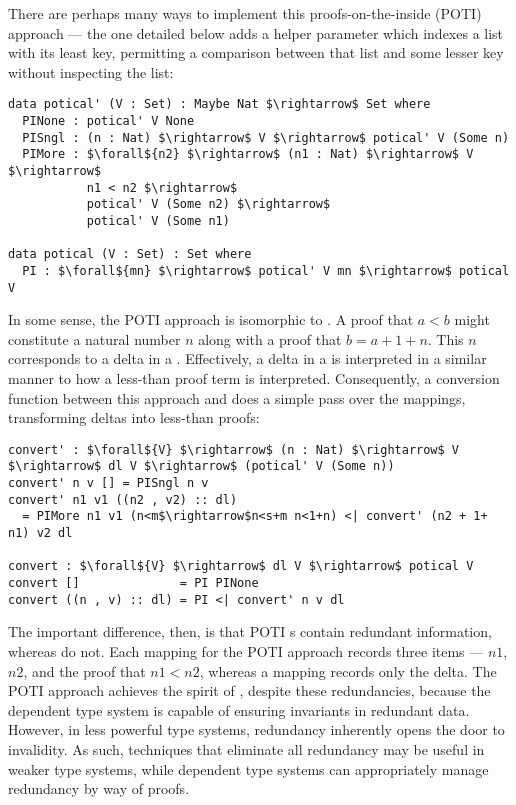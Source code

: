 There are perhaps many ways to implement this proofs-on-the-inside (POTI) \cal{} approach --- the one detailed below adds a helper parameter which indexes a list with its least key,
%
permitting a comparison between that list and some lesser key without inspecting the list:
%
\begin{lstlisting}
data potical' (V : Set) : Maybe Nat $\rightarrow$ Set where
  PINone : potical' V None
  PISngl : (n : Nat) $\rightarrow$ V $\rightarrow$ potical' V (Some n)
  PIMore : $\forall${n2} $\rightarrow$ (n1 : Nat) $\rightarrow$ V $\rightarrow$
           n1 < n2 $\rightarrow$
           potical' V (Some n2) $\rightarrow$
           potical' V (Some n1)

data potical (V : Set) : Set where
  PI : $\forall${mn} $\rightarrow$ potical' V mn $\rightarrow$ potical V
\end{lstlisting}

In some sense, the POTI \cal{} approach is isomorphic to \dds.
%
A proof that $a < b$ might constitute a natural number $n$ along with a proof that $b = a + 1 + n$.
%
This $n$ corresponds to a delta in a \dd.
%
Effectively, a delta in a \dd{} is interpreted in a similar manner to how a less-than proof term is interpreted.
%
Consequently, a conversion function between this approach and \dds{} does a simple pass over the mappings, transforming deltas into less-than proofs:
%
\begin{lstlisting}
convert' : $\forall${V} $\rightarrow$ (n : Nat) $\rightarrow$ V $\rightarrow$ dl V $\rightarrow$ (potical' V (Some n))
convert' n v [] = PISngl n v
convert' n1 v1 ((n2 , v2) :: dl)
  = PIMore n1 v1 (n<m$\rightarrow$n<s+m n<1+n) <| convert' (n2 + 1+ n1) v2 dl

convert : $\forall${V} $\rightarrow$ dl V $\rightarrow$ potical V
convert []              = PI PINone
convert ((n , v) :: dl) = PI <| convert' n v dl
\end{lstlisting}

The important difference, then, is that POTI \cal{}s contain redundant information, whereas \dds{} do not.
%
Each mapping for the POTI \cal{} approach records three items --- $n1$, $n2$, and the proof that $n1 < n2$, whereas a \dd{} mapping records only the delta.
%
The POTI \cal{} approach achieves the spirit of \SemTot{}, despite these redundancies, because the dependent type system is capable of ensuring invariants in redundant data.
%
However, in less powerful type systems, redundancy inherently opens the door to invalidity.
%
As such, techniques that eliminate all redundancy may be useful in weaker type systems, while dependent type systems can appropriately manage redundancy by way of \prop{} proofs.

